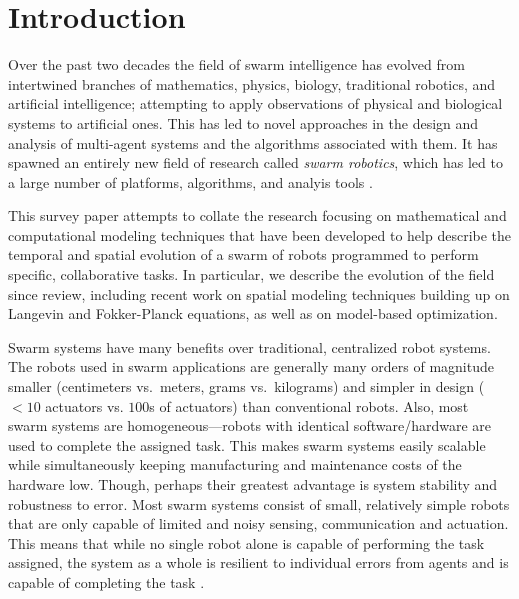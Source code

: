 \documentclass[Main.tex]{subfiles}
\begin{document}
\section{Introduction}
Over the past two decades the field of swarm intelligence has evolved from intertwined branches of mathematics, physics, biology, traditional robotics, and artificial intelligence; attempting to apply observations of physical and biological systems to artificial ones. This has led to novel approaches in the design and analysis of multi-agent systems and the algorithms associated with them. It has spawned an entirely new field of research called \emph{swarm robotics}\citep{Sahin2005}, which has led to a large number of platforms, algorithms, and analyis tools \citep{Bramiblla2013}.

This survey paper attempts to collate the research focusing on mathematical and computational modeling techniques that have been developed to help describe the temporal and spatial evolution of a swarm of robots programmed to perform specific, collaborative tasks. In particular, we describe the evolution of the field since  review, including recent work on spatial modeling techniques building up on Langevin and Fokker-Planck equations, as well as on model-based optimization.

Swarm systems have many benefits over traditional, centralized robot systems. The robots used in swarm applications are generally many orders of magnitude smaller (centimeters vs.\ meters, grams vs.\ kilograms) and simpler in design ($<10$ actuators vs. $100$s of actuators) than conventional robots. Also, most swarm systems are homogeneous---robots with identical software/hardware are used to complete the assigned task. This makes swarm systems easily scalable while simultaneously keeping manufacturing and maintenance costs of the hardware low. Though, perhaps their greatest advantage is system stability and robustness to error. Most swarm systems consist of small, relatively simple robots that are only capable of limited and noisy sensing, communication and actuation. This means that while no single robot alone is capable of performing the task assigned, the system as a whole is resilient to individual errors from agents and is capable of completing the task \cite{Winfield2005}.
\end{document}
